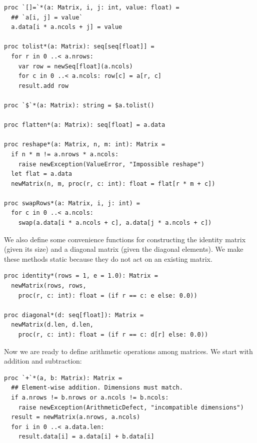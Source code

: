 \documentclass[justified, sixbynine]{tufte-book}
\def\ft{\small\tt}
\theoremstyle{plain}%
\newtheorem * {corollary}{Corollary}
\theoremstyle{definition}
\theoremstyle{remark}
\newtheorem * {remark}{Remark}
\newtheorem * {note}{Note}
\begin{document}
\begin{fullwidth}
\begin{lstlisting}[caption={in file: {\ft nlib/matrix.nim}}]
proc `[]=`*(a: Matrix, i, j: int, value: float) =
  ## `a[i, j] = value`
  a.data[i * a.ncols + j] = value

proc tolist*(a: Matrix): seq[seq[float]] =
  for r in 0 ..< a.nrows:
    var row = newSeq[float](a.ncols)
    for c in 0 ..< a.ncols: row[c] = a[r, c]
    result.add row

proc `$`*(a: Matrix): string = $a.tolist()

proc flatten*(a: Matrix): seq[float] = a.data

proc reshape*(a: Matrix, n, m: int): Matrix =
  if n * m != a.nrows * a.ncols:
    raise newException(ValueError, "Impossible reshape")
  let flat = a.data
  newMatrix(n, m, proc(r, c: int): float = flat[r * m + c])

proc swapRows*(a: Matrix, i, j: int) =
  for c in 0 ..< a.ncols:
    swap(a.data[i * a.ncols + c], a.data[j * a.ncols + c])
\end{lstlisting}


We also define some convenience functions for constructing the identity matrix (given its size) and a diagonal matrix (given the diagonal elements). We make these methods static because they do not act on an existing matrix.

\begin{lstlisting}[caption={in file: {\ft nlib/matrix.nim}}]
proc identity*(rows = 1, e = 1.0): Matrix =
  newMatrix(rows, rows,
    proc(r, c: int): float = (if r == c: e else: 0.0))

proc diagonal*(d: seq[float]): Matrix =
  newMatrix(d.len, d.len,
    proc(r, c: int): float = (if r == c: d[r] else: 0.0))
\end{lstlisting}

Now we are ready to define arithmetic operations among matrices. We start with addition and subtraction:


\begin{lstlisting}[caption={in file: {\ft nlib/matrix.nim}}]
proc `+`*(a, b: Matrix): Matrix =
  ## Element-wise addition. Dimensions must match.
  if a.nrows != b.nrows or a.ncols != b.ncols:
    raise newException(ArithmeticDefect, "incompatible dimensions")
  result = newMatrix(a.nrows, a.ncols)
  for i in 0 ..< a.data.len:
    result.data[i] = a.data[i] + b.data[i]


\end{lstlisting}
\end{fullwidth}
\end{document}
